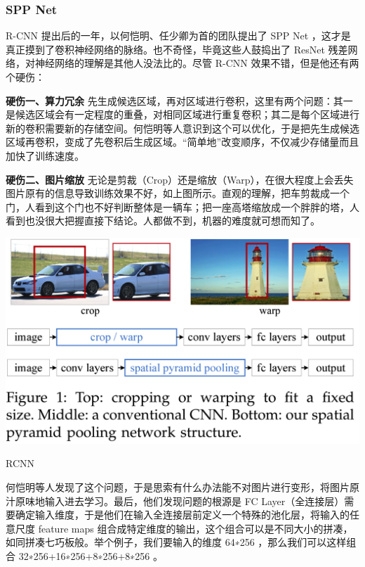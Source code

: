 \subsubsection{SPP Net}
R-CNN 提出后的一年，以何恺明、任少卿为首的团队提出了 SPP Net ，这才是真正摸到了卷积神经网络的脉络。也不奇怪，毕竟这些人鼓捣出了 ResNet 残差网络，对神经网络的理解是其他人没法比的。尽管 R-CNN 效果不错，但是他还有两个硬伤：

\textbf{硬伤一、算力冗余}
先生成候选区域，再对区域进行卷积，这里有两个问题：其一是候选区域会有一定程度的重叠，对相同区域进行重复卷积；其二是每个区域进行新的卷积需要新的存储空间。何恺明等人意识到这个可以优化，于是把先生成候选区域再卷积，变成了先卷积后生成区域。“简单地”改变顺序，不仅减少存储量而且加快了训练速度。

\textbf{硬伤二、图片缩放}
无论是剪裁（Crop）还是缩放（Warp），在很大程度上会丢失图片原有的信息导致训练效果不好，如上图所示。直观的理解，把车剪裁成一个门，人看到这个门也不好判断整体是一辆车；把一座高塔缩放成一个胖胖的塔，人看到也没很大把握直接下结论。人都做不到，机器的难度就可想而知了。
\begin{uscfigure}
	\includegraphics[width=\textwidth]{./Pictures/sppnet_crop_warp.png}	
	\caption{RCNN}
\end{uscfigure}
何恺明等人发现了这个问题，于是思索有什么办法能不对图片进行变形，将图片原汁原味地输入进去学习。最后，他们发现问题的根源是 FC Layer（全连接层）需要确定输入维度，于是他们在输入全连接层前定义一个特殊的池化层，将输入的任意尺度 feature maps 组合成特定维度的输出，这个组合可以是不同大小的拼凑，如同拼凑七巧板般。举个例子，我们要输入的维度 64∗256 ，那么我们可以这样组合 32∗256+16∗256+8∗256+8∗256 。
